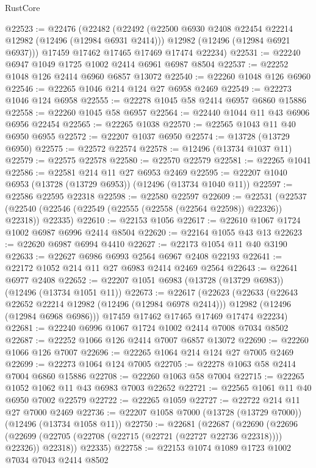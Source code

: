\begin{lexlean}{RustCore}
\begin{coremodule}
@22523 := @22476
    (@22482
      (@22492
        (@22500 @6930 @2408 @22454 @22214 @12982 (@12496 (@12984 @6931 @2414)))
        @12982
        (@12496 (@12984 @6921 @6937)))
      @17459
      @17462
      @17465
      @17469
      @17474
      @22234)
@22531 := @22240 @6947 @1049 @1725 @1002 @2414 @6961 @6987 @8504
@22537 := @22252 @1048 @126 @2414 @6960 @6857 @13072
@22540 := @22260 @1048 @126 @6960
@22546 := @22265 @1046 @214 @124 @27 @6958 @2469
@22549 := @22273 @1046 @124 @6958
@22555 := @22278 @1045 @58 @2414 @6957 @6860 @15886
@22558 := @22260 @1045 @58 @6957
@22564 := @22440 @1044 @11 @43 @6906 @6956 @22454
@22565 := @22265 @1038
@22570 := @22565 @1043 @11 @40 @6950 @6955
@22572 := @22207 @1037 @6950
@22574 := @13728 (@13729 @6950)
@22575 := @22572 @22574
@22578 := @12496 (@13734 @1037 @11)
@22579 := @22575 @22578
@22580 := @22570 @22579
@22581 := @22265 @1041
@22586 := @22581 @214 @11 @27 @6953 @2469
@22595 := @22207 @1040 @6953 (@13728 (@13729 @6953)) (@12496 (@13734 @1040 @11))
@22597 := @22586 @22595 @22318
@22598 := @22580 @22597
@22609 := @22531
    (@22537 (@22540 (@22546 (@22549 (@22555 (@22558 (@22564 @22598)) @22326)) @22318)) @22335)
@22610 := @22153 @1056
@22617 := @22610 @1067 @1724 @1002 @6987 @6996 @2414 @8504
@22620 := @22164 @1055 @43 @13
@22623 := @22620 @6987 @6994 @4410
@22627 := @22173 @1054 @11 @40 @3190
@22633 := @22627 @6986 @6993 @2564 @6967 @2408 @22193
@22641 := @22172 @1052 @214 @11 @27 @6983 @2414 @2469 @2564
@22643 := @22641 @6977 @2408
@22652 := @22207 @1051 @6983 (@13728 (@13729 @6983)) (@12496 (@13734 @1051 @11))
@22673 := @22617
    (@22623
      (@22633
        (@22643 @22652 @22214 @12982 (@12496 (@12984 @6978 @2414)))
        @12982
        (@12496 (@12984 @6968 @6986)))
      @17459
      @17462
      @17465
      @17469
      @17474
      @22234)
@22681 := @22240 @6996 @1067 @1724 @1002 @2414 @7008 @7034 @8502
@22687 := @22252 @1066 @126 @2414 @7007 @6857 @13072
@22690 := @22260 @1066 @126 @7007
@22696 := @22265 @1064 @214 @124 @27 @7005 @2469
@22699 := @22273 @1064 @124 @7005
@22705 := @22278 @1063 @58 @2414 @7004 @6860 @15886
@22708 := @22260 @1063 @58 @7004
@22715 := @22265 @1052 @1062 @11 @43 @6983 @7003 @22652
@22721 := @22565 @1061 @11 @40 @6950 @7002 @22579
@22722 := @22265 @1059
@22727 := @22722 @214 @11 @27 @7000 @2469
@22736 := @22207 @1058 @7000 (@13728 (@13729 @7000)) (@12496 (@13734 @1058 @11))
@22750 := @22681
    (@22687
      (@22690
        (@22696 (@22699 (@22705 (@22708 (@22715 (@22721 (@22727 @22736 @22318)))) @22326)) @22318))
      @22335)
@22758 := @22153 @1074 @1089 @1723 @1002 @7034 @7043 @2414 @8502

\end{coremodule}
\end{lexlean}
